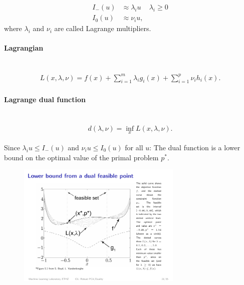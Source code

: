 \begin{align*}
    I_-(u) &\approx \lambda_i u &\lambda_i \geq 0\\
    I_0(u) &\approx \nu_i u,
\end{align*}
where $\lambda_i$ and $\nu_i$ are called Lagrange multipliers.

\paragraph{Lagrangian} \
\begin{align*}
    L(x,\lambda, \nu) =  f(x) + \sum_{i=1}^m \lambda_i g_i(x) + \sum_{i=1}^p \nu_i h_i(x).
\end{align*}
\paragraph{Lagrange dual function} \
\begin{align*}
    d(\lambda, \nu) = \inf_x L(x,\lambda, \nu).
\end{align*}

Since $\lambda_i u\leq I_-(u)$ and $\nu_i u\leq I_0 (u)$ for all $u$: The dual function is a lower bound on the optimal value of the primal problem $p^*$.
\begin{figure}[H]
    \centering
    \includegraphics[width=0.7\textwidth]{img/11_lagrangian_dual_function_lower_bound}
\end{figure}

